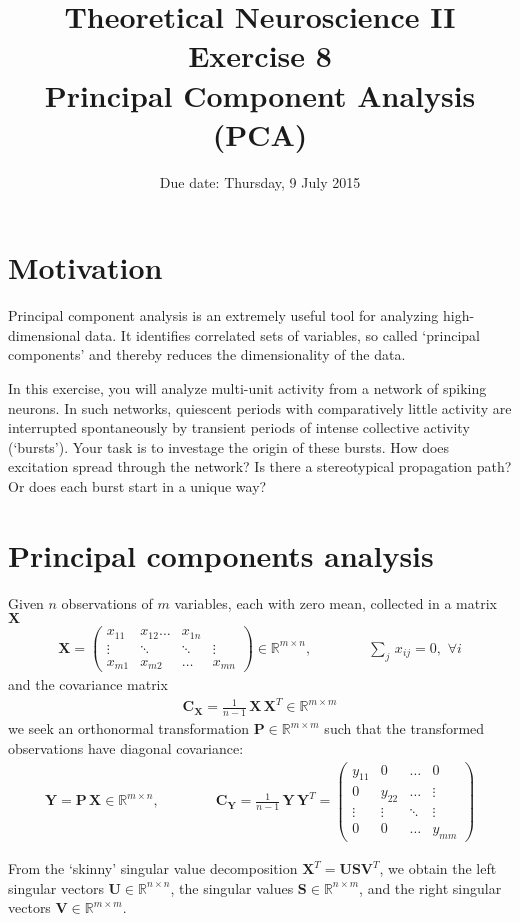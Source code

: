 \documentclass[a4paper,12pt]{article}
\title{\bf Theoretical Neuroscience II\\Exercise 8\\ Principal Component Analysis (PCA)}
\author{Due date: Thursday, 9 July 2015}
\newcommand{\ba}{\begin{eqnarray*}}
\newcommand{\ea}{\end{eqnarray*}}
\newcommand{\by}{\begin{array}}
\newcommand{\ey}{\end{array}}
\newcommand{\bs}[1]{\boldsymbol #1 }
\begin{document}
\maketitle

\section{Motivation}

Principal component analysis is an extremely useful tool for analyzing high-dimensional data.  It identifies correlated sets of variables, so called `principal components' and thereby reduces the dimensionality of the data.  

In this exercise, you will analyze multi-unit activity from a network of spiking neurons.  In such networks, quiescent periods with comparatively little activity are interrupted spontaneously by transient periods of intense collective activity (`bursts').  Your task is to investage the origin of these bursts.  How does excitation spread through the network?  Is there a stereotypical propagation path?  Or does each burst start in a unique way?


\section{Principal components analysis}

Given $n$ observations of $m$ variables, each with zero mean, collected in a matrix $\bs X$
\ba
\bs X =\left(  \by{cccc} x_{11} & x_{12} \ldots & x_{1n} \\ \vdots & \ddots & \ddots & \vdots \\ x_{m1} & x_{m2} & \ldots & x_{mn} \ey \right)  \in \mathbb{R}^{m \times n}, \qquad\qquad \sum_j \, x_{ij} = 0, \,\, \forall i
\ea
and the covariance matrix
\ba
\bs C_{\bs X} = \frac{1}{n-1} \, \bs X \, \bs X^T \in \mathbb{R}^{m \times m}
\ea
we seek an orthonormal transformation $\bs P  \in \mathbb{R}^{m \times m}$ such that the transformed observations have diagonal covariance:
\ba
\bs Y = \bs P \, \bs X  \in \mathbb{R}^{m \times n}, \qquad\qquad \bs C_{\bs Y} = \frac{1}{n-1} \, \bs Y \, \bs Y^T = \left(  \by{cccc} y_{11} & 0 &\ldots & 0 \\ 0 & y_{22} & \ldots & \vdots \\ \vdots & \vdots & \ddots & \vdots \\ 0 & 0 & \ldots & y_{mm} \ey \right) 
\ea

From the `skinny' singular value decomposition $\bs X^T = \bs U \bs S \bs V^T$, we obtain the left singular vectors $\bs U \in  \mathbb{R}^{n \times n}$, the singular values  $\bs S \in  \mathbb{R}^{n \times m}$, and the right singular vectors $\bs V  \in \mathbb{R}^{m \times m}$.
\end{document}
